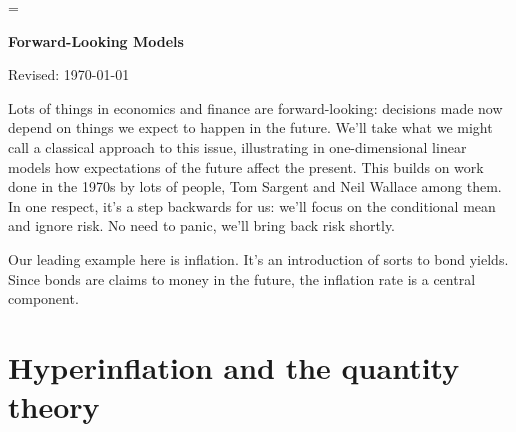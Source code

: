 \documentclass[11pt]{article}
\begin{document}
\parskip=\bigskipamount
\parindent=0.0in
\thispagestyle{empty}


\bigskip\bigskip
\centerline{\Large \bf Forward-Looking Models}
\centerline{Revised: \today}

\begin{comment}
??

Think about how this is organized, also how it ties
in with recursive methods.  Mon pol?  Something else?

Lucas:
http://www.nber.org/chapters/c6264.pdf

Page 199:
I take the purpose of this session to be to elicit views on economic
policy from economists of different points of view. The title
of the session, “Macroeconomic Policy, 1974/75 : What Should Have
Been Done?” does not seem to me useful for this purpose.

Page 205:
our ability as economists to predict the responses of
agents rests, in situations where expectations about the future matter,
on our understanding of the stochastic environment agents believe themselves
to be operating in. In practice, this limits the class of policies the
consequences of which we can hope to assess in advance to policies
generated by fixed, well understood, relatively permanent rules (or functions
relating policy actions taken to the state of the economy).
\end{comment}

\bigskip
Lots of things in economics and finance are forward-looking:
decisions made now depend on things we expect to happen in the future.
We'll take what we might call a classical approach to this issue,
illustrating in one-dimensional linear models how expectations of
the future affect the present.
This builds on work done in the 1970s by lots of people,
Tom Sargent and Neil Wallace among them.
In one respect, it's a step backwards for us:  we'll focus on the conditional mean
and ignore risk.
No need to panic, we'll bring back risk shortly.

Our leading example here is inflation.
It's an introduction of sorts to bond yields.
Since bonds are claims to money in the future,
the inflation rate is a central component.


\section{Hyperinflation and the quantity theory}
\end{document}
